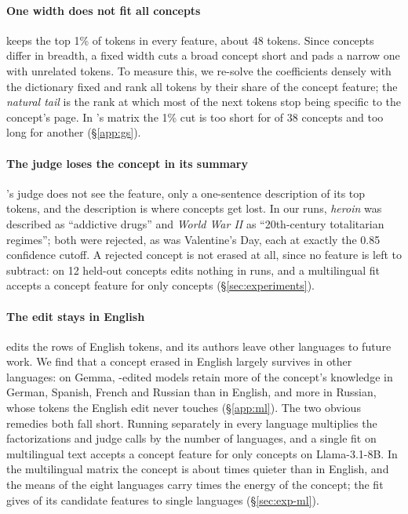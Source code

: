 \paragraph{One width does not fit all concepts}
\ember{} keeps the top 1\% of tokens in every feature, about 48 tokens.
Since concepts differ in breadth, a fixed width cuts a broad concept short and pads a narrow one with unrelated tokens.
To measure this, we re-solve the coefficients densely with the dictionary fixed and rank all tokens by their share of the concept feature; the \emph{natural tail} is the rank at which most of the next tokens stop being specific to the concept's page.
In \ember{}'s matrix the 1\% cut is too short for  of 38 concepts and too long for another  (\S\ref{app:gs}).

\paragraph{The judge loses the concept in its summary}
\ember{}'s judge does not see the feature, only a one-sentence description of its top tokens, and the description is where concepts get lost.
In our runs, \emph{heroin} was described as ``addictive drugs'' and \emph{World War II} as ``20th-century totalitarian regimes''; both were rejected, as was Valentine's Day, each at exactly the 0.85 confidence cutoff.
A rejected concept is not erased at all, since no feature is left to subtract: on 12 held-out concepts \ember{} edits nothing in  runs, and a multilingual \ember{} fit accepts a concept feature for only  concepts (\S\ref{sec:experiments}).

\paragraph{The edit stays in English}
\ember{} edits the rows of English tokens, and its authors leave other languages to future work.
We find that a concept erased in English largely survives in other languages: on Gemma, \ember{}-edited models retain  more of the concept's knowledge in German, Spanish, French and Russian than in English, and  more in Russian, whose tokens the English edit never touches (\S\ref{app:ml}).
The two obvious remedies both fall short.
Running \ember{} separately in every language multiplies the factorizations and judge calls by the number of languages, and a single \ember{} fit on multilingual text accepts a concept feature for only  concepts on Llama-3.1-8B.
In the multilingual matrix the concept is about  times quieter than in English, and the means of the eight languages carry  times the energy of the concept; the fit gives  of its candidate features to single languages (\S\ref{sec:exp-ml}).


